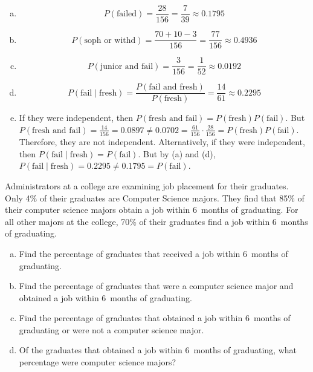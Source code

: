\documentclass[11pt,letterpaper]{article}
\begin{document}
\begin{enumerate}[(a)]
\item 
	\[
	P(\text{failed})= \dfrac{28}{156}= \dfrac{7}{39} \approx 0.1795
	\]

\item 
	\[
	P(\text{soph or withd})= \dfrac{70 + 10 - 3}{156}= \dfrac{77}{156} \approx 0.4936
	\]

\item 
	\[
	P(\text{junior and fail})= \dfrac{3}{156}= \dfrac{1}{52} \approx 0.0192
	\]

\item 
	\[
	P(\text{fail} \;|\; \text{fresh})= \dfrac{P(\text{fail and fresh})}{P(\text{fresh})}= \dfrac{14}{61} \approx 0.2295
	\]

\item If they were independent, then $P(\text{fresh and fail})= P(\text{fresh}) P(\text{fail})$. But $P(\text{fresh and fail})= \frac{14}{156}= 0.0897 \neq 0.0702= \frac{61}{156} \cdot \frac{28}{156}= P(\text{fresh}) P(\text{fail})$. Therefore, they are not independent. Alternatively, if they were independent, then $P(\text{fail} \;|\; \text{fresh})= P(\text{fail})$. But by (a) and (d), $P(\text{fail} \;|\; \text{fresh})= 0.2295 \neq 0.1795= P(\text{fail})$.
\end{enumerate}



\newpage



 Administrators at a college are examining job placement for their graduates. Only 4\% of their graduates are Computer Science majors. They find that 85\% of their computer science majors obtain a job within 6~months of graduating. For all other majors at the college, 70\% of their graduates find a job within 6~months of graduating. 
	\begin{enumerate}[(a)]
	\item Find the percentage of graduates that received a job within 6~months of graduating. 
	\item Find the percentage of graduates that were a computer science major and obtained a job within 6~months of graduating.
	\item Find the percentage of graduates that obtained a job within 6~months of graduating or were not a computer science major. 
	\item Of the graduates that obtained a job within 6~months of graduating, what percentage were computer science majors?	
	\end{enumerate} \pspace
\end{document}
